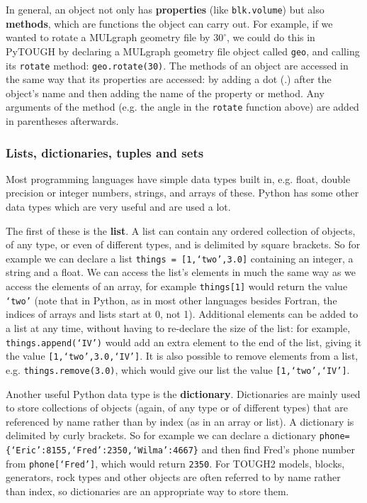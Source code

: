 In general, an object not only has \textbf{properties} (like \texttt{blk.volume}) but also \textbf{methods}, which are functions the object can carry out.  For example, if we wanted to rotate a MULgraph geometry file by $30^{\circ}$, we could do this in PyTOUGH by declaring a MULgraph geometry file object called \texttt{geo}, and calling its \texttt{rotate} method: \texttt{geo.rotate(30)}.  The methods of an object are accessed in the same way that its properties are accessed: by adding a dot (.) after the object's name and then adding the name of the property or method.  Any arguments of the method (e.g. the angle in the \texttt{rotate} function above) are added in parentheses afterwards.

\subsubsection{Lists, dictionaries, tuples and sets}

Most programming languages have simple data types built in, e.g. float, double precision or integer numbers, strings, and arrays of these.  Python has some other data types which are very useful and are used a lot.

The first of these is the \textbf{list}.  A list can contain any ordered collection of objects, of any type, or even of different types, and is delimited by square brackets.  So for example we can declare a list \texttt{things = [1,`two',3.0]} containing an integer, a string and a float.  We can access the list's elements in much the same way as we access the elements of an array, for example \texttt{things[1]} would return the value \texttt{`two'} (note that in Python, as in most other languages besides Fortran, the indices of arrays and lists start at 0, not 1).  Additional elements can be added to a list at any time, without having to re-declare the size of the list: for example, \texttt{things.append(`IV')} would add an extra element to the end of the list, giving it the value \texttt{[1,`two',3.0,`IV']}.  It is also possible to remove elements from a list, e.g. \texttt{things.remove(3.0)}, which would give our list the value \texttt{[1,`two',`IV']}.

Another useful Python data type is the \textbf{dictionary}.  Dictionaries are mainly used to store collections of objects (again, of any type or of different types) that are referenced by name rather than by index (as in an array or list).  A dictionary is delimited by curly brackets.  So for example we can declare a dictionary \texttt{phone=\{`Eric':8155,`Fred':2350,`Wilma':4667\}} and then find Fred's phone number from \texttt{phone[`Fred']}, which would return \texttt{2350}.  For TOUGH2 models, blocks, generators, rock types and other objects are often referred to by name rather than index, so dictionaries are an appropriate way to store them.

